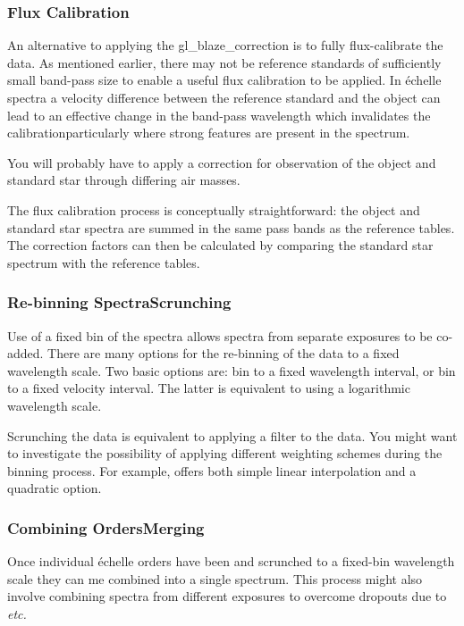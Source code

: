 \subsubsection{Flux Calibration}

An alternative to applying the 
{gl_blaze_correction} is to fully flux-calibrate the data.
As mentioned earlier, there may not be reference
standards of sufficiently small band-pass size to enable a useful flux
calibration to be applied.  In \'{e}chelle spectra a velocity difference
between the reference standard and the object can lead to an effective
change in the band-pass wavelength which invalidates the
calibration\sgspec{---}{ - }particularly where strong features are
present in the spectrum.

You will probably have to apply a correction for observation of the
object and standard star through differing air masses.

The flux calibration process is conceptually straightforward: the object and
standard star spectra are summed in the same pass bands as the reference
tables.  The correction factors can then be calculated by comparing the
standard star spectrum with the reference tables.

\subsubsection{Re-binning Spectra\sgspec{---}{ - }Scrunching}

Use of a fixed bin of the spectra allows spectra from separate exposures
to be co-added.
There are many options for the re-binning of the data to a fixed
wavelength scale.  Two basic options are: bin to a fixed wavelength
interval, or bin to a fixed velocity interval.  The latter is
equivalent to using a logarithmic wavelength scale.

Scrunching the data is equivalent to applying a filter to the data.
You might want to investigate the possibility of applying different
weighting schemes during the binning process.
For example,  
offers both simple linear interpolation and a quadratic option.

\subsubsection{Combining Orders\sgspec{---}{ - }Merging}

Once individual \'{e}chelle orders have been
 and scrunched
to a fixed-bin wavelength scale they can me combined into a single spectrum.
This process might also involve combining spectra from different exposures
to overcome dropouts due to 
{\em etc.}

